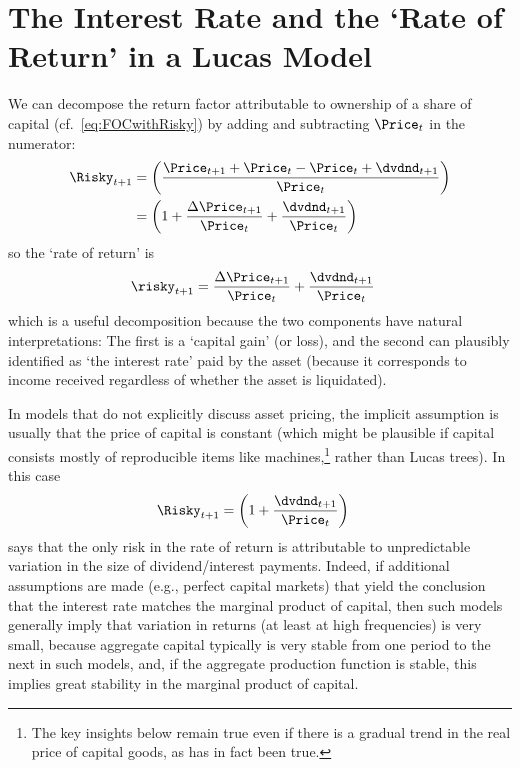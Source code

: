 \documentclass{handout}
\begin{document}
\section{The Interest Rate and the `Rate of Return' in a Lucas Model}
We can decompose the return factor attributable to ownership of a share of capital (cf.\ \eqref{eq:FOCwithRisky}) by adding and subtracting $\Price_{t}$ in the numerator:
\begin{equation}\begin{gathered}\begin{aligned}
  \Risky_{t+1} & =  \left(\frac{{\Price}_{t+1}+{\Price}_{t}-{\Price}_{t}+\dvdnd_{t+1}}{\Price_{t}}\right) \notag
\\        & =  \left(1+\frac{\Delta {\Price}_{t+1}}{\Price_{t}}+\frac{\dvdnd_{t+1}}{\Price_{t}}\right) \label{eq:RiskyDecompose}
\end{aligned}\end{gathered}\end{equation}
so the `rate of return' is 
\begin{equation}\begin{gathered}\begin{aligned}
 \risky_{t+1}    & =  \frac{\Delta {\Price}_{t+1}}{\Price_{t}}+\frac{\dvdnd_{t+1}}{\Price_{t}} \label{eq:riskyDecompose}
\end{aligned}\end{gathered}\end{equation}
which is a useful decomposition because the two components 
have natural interpretations: The first is a `capital gain' (or loss),
and the second can plausibly identified as `the interest rate' paid
by the asset (because it corresponds to income received regardless of whether the asset
is liquidated).

In models that do not explicitly discuss asset pricing, the
implicit assumption is usually that the price of capital is constant
(which might be plausible if capital consists mostly of reproducible items
like machines,\footnote{The key insights below remain true even if there is a gradual trend in the real price of capital goods, as has in fact been true.} rather than Lucas trees).  In this case
\begin{equation*}\begin{gathered}\begin{aligned}
  \Risky_{t+1} & =  \left(1+\frac{\dvdnd_{t+1}}{\Price_{t}}\right)
\end{aligned}\end{gathered}\end{equation*}
says that the only risk in the rate of return is attributable to unpredictable variation in the size of 
dividend/interest payments.  Indeed, if additional assumptions are made (e.g., perfect capital markets) that yield the conclusion that the interest rate matches the marginal product of capital, then such models generally imply that variation in returns (at least at high frequencies) is very small, because aggregate capital typically is very stable from one period to the next in such models, and, if the aggregate production function is stable, this implies great stability in the marginal product of capital.
\end{document}
